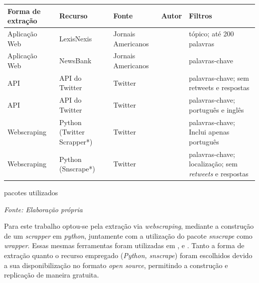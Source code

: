 \noindent
\begin{minipage}{\textwidth}
\centering
\small %
\begin{tabularx}{0.775\textwidth}{
>{\centering\arraybackslash}m{1.9cm}
>{\centering\arraybackslash}m{1.8cm}
>{\centering\arraybackslash}m{1.8cm}
>{\centering\arraybackslash}m{2.2cm}
>{\centering\arraybackslash}m{2.5cm}
}
\rowcolor{gray!20}
\hline
\textbf{Forma de extração} & \textbf{Recurso} & \textbf{Fonte} & \textbf{Autor} & \textbf{Filtros} \\ \hline
Aplicação Web & LexisNexis & Jornais Americanos & \textcite{shapiro_measuring_2020} & tópico; até 200 palavras \\ \hline
Aplicação Web & NewsBank & Jornais Americanos & \textcite{baker_measuring_2016} & palavras-chave \\ \hline
API & API do Twitter & Twitter & \textcite{cortiz_weakly_2021} & palavras-chave; sem retweets e respostas \\ \hline
API & API do Twitter & Twitter & \textcite{garcia_topic_2021} & palavras-chave; português e inglês \\ \hline
Webscraping & Python (Twitter Scrapper*) & Twitter & \textcite{de_melo_comparing_2021} & palavras-chave; Inclui apenas português \\ \hline
Webscraping & Python (Snscrape*) & Twitter & \textcite{anbu_durai_sentiment_2023} & palavras-chave; localização; sem \textit{retweets} e respostas \\ 
\hline
\end{tabularx}
\label{tab:metodos_extracao} %
\par *pacotes utilizados
\par\noindent
    \begin{minipage}{\textwidth}
        \centering
        \footnotesize %
        \textit{Fonte: Elaboração própria}
    \end{minipage}
\end{minipage}
\bigskip %


Para este trabalho optou-se pela extração via \textit{webscraping}, mediante a construção de um \textit{scrapper} em \textit{python}, juntamente com a utilização do pacote \textit{snscrape} como \textit{wrapper}. Essas mesmas ferramentas foram utilizadas em \textcite{anbu_durai_sentiment_2023}, \textcite{okey_investigating_2023} e \textcite{mohamed_ridhwan_leveraging_2021}. Tanto a forma de extração quanto o recurso empregado (\textit{Python, snscrape}) foram escolhidos devido a sua disponibilização no formato \textit{open source}, permitindo a construção e replicação de maneira gratuita.

